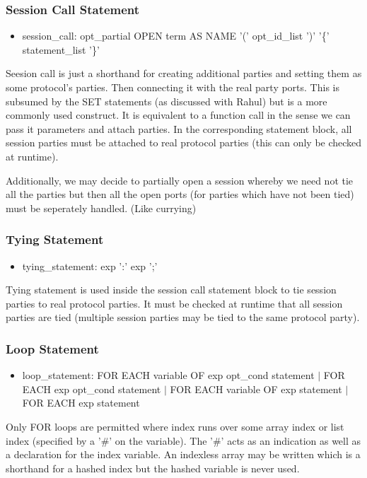 \documentclass{article}
\begin{document}
\subsubsection{Session Call Statement}
\begin{itemize}
\item session\_call: opt\_partial OPEN term AS NAME '(' opt\_id\_list ')' '\{' statement\_list '\}'
\end{itemize}

Seesion call is just a shorthand for creating additional parties and setting them as some protocol's parties. Then connecting it with the real party ports. This is subsumed by the SET statements (as discussed with Rahul) but is a more commonly used construct. It is equivalent to a function call in the sense we can pass it parameters and attach parties. In the corresponding statement block, all session parties must be attached to real protocol parties (this can only be checked at runtime).

Additionally, we may decide to partially open a session whereby we need not tie all the parties but then all the open ports (for parties which have not been tied) must be seperately handled. (Like currying)

\subsubsection{Tying Statement}
\begin{itemize}
\item tying\_statement: exp ':' exp ';'
\end{itemize}

Tying statement is used inside the session call statement block to tie session parties to real protocol parties. It must be checked at runtime that all session parties are tied (multiple session parties may be tied to the same protocol party).

\subsubsection{Loop Statement}
\begin{itemize}
\item loop\_statement: FOR EACH variable OF exp opt\_cond statement $|$ FOR EACH exp opt\_cond statement 
$|$ FOR EACH variable OF exp statement $|$ FOR EACH exp statement
\end{itemize}

Only FOR loops are permitted where index runs over some array index or list index (specified by a '\#' on the variable). The '\#' acts as an indication as well as a declaration for the index variable. An indexless array may be written which is a shorthand for a hashed index but the hashed variable is never used.
\end{document}
